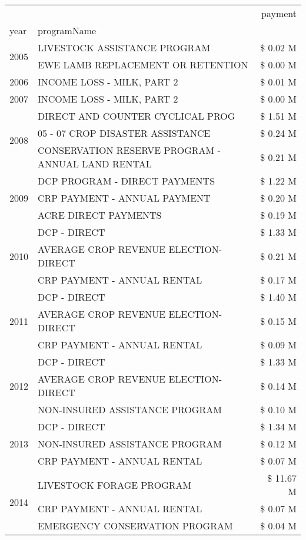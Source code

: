 \begin{tabular}{llr}
\toprule
 &  & payment \\
year & programName &  \\
\midrule
\multirow[t]{2}{*}{2005} & LIVESTOCK ASSISTANCE PROGRAM & \$ 0.02 M \\
 & EWE LAMB REPLACEMENT OR RETENTION & \$ 0.00 M \\
\cline{1-3}
2006 & INCOME LOSS - MILK, PART 2 & \$ 0.01 M \\
\cline{1-3}
2007 & INCOME LOSS - MILK, PART 2 & \$ 0.00 M \\
\cline{1-3}
\multirow[t]{3}{*}{2008} & DIRECT AND COUNTER CYCLICAL PROG & \$ 1.51 M \\
 & 05 - 07 CROP DISASTER ASSISTANCE & \$ 0.24 M \\
 & CONSERVATION RESERVE PROGRAM - ANNUAL LAND RENTAL & \$ 0.21 M \\
\cline{1-3}
\multirow[t]{3}{*}{2009} & DCP PROGRAM - DIRECT PAYMENTS & \$ 1.22 M \\
 & CRP PAYMENT - ANNUAL PAYMENT & \$ 0.20 M \\
 & ACRE DIRECT PAYMENTS & \$ 0.19 M \\
\cline{1-3}
\multirow[t]{3}{*}{2010} & DCP - DIRECT & \$ 1.33 M \\
 & AVERAGE CROP REVENUE ELECTION-DIRECT & \$ 0.21 M \\
 & CRP PAYMENT - ANNUAL RENTAL & \$ 0.17 M \\
\cline{1-3}
\multirow[t]{3}{*}{2011} & DCP - DIRECT & \$ 1.40 M \\
 & AVERAGE CROP REVENUE ELECTION-DIRECT & \$ 0.15 M \\
 & CRP PAYMENT - ANNUAL RENTAL & \$ 0.09 M \\
\cline{1-3}
\multirow[t]{3}{*}{2012} & DCP - DIRECT & \$ 1.33 M \\
 & AVERAGE CROP REVENUE ELECTION-DIRECT & \$ 0.14 M \\
 & NON-INSURED ASSISTANCE PROGRAM & \$ 0.10 M \\
\cline{1-3}
\multirow[t]{3}{*}{2013} & DCP - DIRECT & \$ 1.34 M \\
 & NON-INSURED ASSISTANCE PROGRAM & \$ 0.12 M \\
 & CRP PAYMENT - ANNUAL RENTAL & \$ 0.07 M \\
\cline{1-3}
\multirow[t]{3}{*}{2014} & LIVESTOCK FORAGE PROGRAM & \$ 11.67 M \\
 & CRP PAYMENT - ANNUAL RENTAL & \$ 0.07 M \\
 & EMERGENCY CONSERVATION PROGRAM & \$ 0.04 M \\

\end{tabular}
